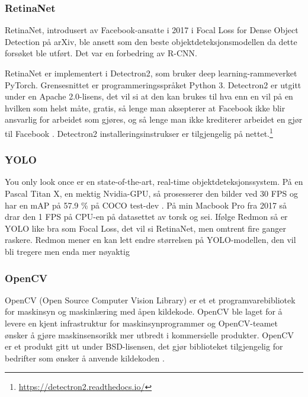 \subsubsection{RetinaNet}

RetinaNet, introdusert av Facebook-ansatte i 2017 i Focal Loss for Dense Object Detection på arXiv, ble ansett som den beste objektdeteksjonsmodellen da dette forsøket ble utført. Det var en forbedring av R-CNN. \cite{Lin m.fl. 2017}

RetinaNet er implementert i Detectron2, som bruker deep learning-rammeverket PyTorch. Grensesnittet er programmeringsspråket Python 3. Detectron2 er utgitt under en Apache 2.0-lisens, det vil si at den kan brukes til hva enn en vil på en hvilken som helst måte, gratis, så lenge man aksepterer at Facebook ikke blir ansvarlig for arbeidet som gjøres, og så lenge man ikke krediterer arbeidet en gjør til Facebook \cite{The Apache Software Foundation 2004}. Detectron2 installeringsinstrukser er tilgjengelig på nettet.\footnote{\url{https://detectron2.readthedocs.io/}}

\subsubsection{YOLO}

You only look once er en state-of-the-art, real-time objektdeteksjonssystem. På en Pascal Titan X, en mektig Nvidia-GPU, så prosesserer den bilder ved 30 FPS og har en mAP på 57.9 \% på COCO test-dev \cite{Redmon 2018}. På min Macbook Pro fra 2017 så drar den 1 FPS på CPU-en på datasettet av torsk og sei. Ifølge Redmon så er YOLO like bra som Focal Loss, det vil si RetinaNet, men omtrent fire ganger raskere. Redmon mener en kan lett endre størrelsen på YOLO-modellen, den vil bli tregere men enda mer nøyaktig \cite{Redmon 2016}%

\subsubsection{OpenCV}

OpenCV (Open Source Computer Vision Library) er et et programvarebibliotek for maskinsyn og maskinlæring med åpen kildekode. OpenCV ble laget for å levere en kjent infrastruktur for maskinsynprogrammer og OpenCV-teamet ønsker å gjøre maskinsensorikk mer utbredt i kommersielle produkter. OpenCV er et produkt gitt ut under BSD-lisensen, det gjør biblioteket tilgjengelig for bedrifter som ønsker å anvende kildekoden \cite{OpenCV Team 2020}.

